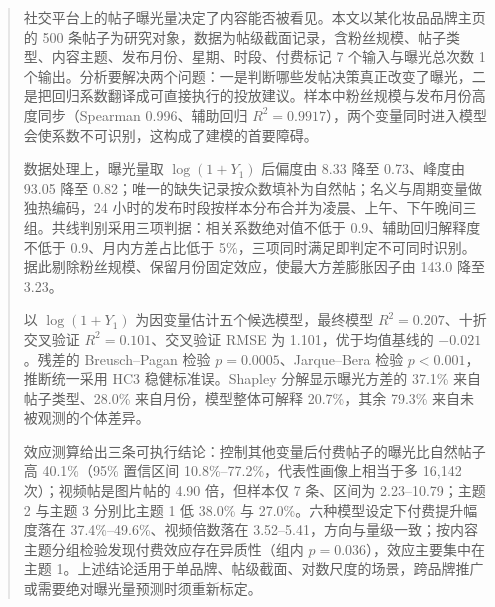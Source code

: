 \begin{abstract}

社交平台上的帖子曝光量决定了内容能否被看见。本文以某化妆品品牌主页的 500 条帖子为研究对象，数据为帖级截面记录，含粉丝规模、帖子类型、内容主题、发布月份、星期、时段、付费标记 7 个输入与曝光总次数 1 个输出。分析要解决两个问题：一是判断哪些发帖决策真正改变了曝光，二是把回归系数翻译成可直接执行的投放建议。样本中粉丝规模与发布月份高度同步（Spearman 0.996、辅助回归 $R^2=0.9917$），两个变量同时进入模型会使系数不可识别，这构成了建模的首要障碍。

数据处理上，曝光量取 $\log(1+Y_1)$ 后偏度由 8.33 降至 0.73、峰度由 93.05 降至 0.82；唯一的缺失记录按众数填补为自然帖；名义与周期变量做独热编码，24 小时的发布时段按样本分布合并为凌晨、上午、下午晚间三组。共线判别采用三项判据：相关系数绝对值不低于 0.9、辅助回归解释度不低于 0.9、月内方差占比低于 5\%，三项同时满足即判定不可同时识别。据此剔除粉丝规模、保留月份固定效应，使最大方差膨胀因子由 143.0 降至 3.23。

以 $\log(1+Y_1)$ 为因变量估计五个候选模型，最终模型 $R^2=0.207$、十折交叉验证 $R^2=0.101$、交叉验证 RMSE 为 1.101，优于均值基线的 $-0.021$。残差的 Breusch--Pagan 检验 $p=0.0005$、Jarque--Bera 检验 $p<0.001$，推断统一采用 HC3 稳健标准误。Shapley 分解显示曝光方差的 37.1\% 来自帖子类型、28.0\% 来自月份，模型整体可解释 20.7\%，其余 79.3\% 来自未被观测的个体差异。

效应测算给出三条可执行结论：控制其他变量后付费帖子的曝光比自然帖子高 40.1\%（95\% 置信区间 10.8\%--77.2\%，代表性画像上相当于多 16,142 次）；视频帖是图片帖的 4.90 倍，但样本仅 7 条、区间为 2.23--10.79；主题 2 与主题 3 分别比主题 1 低 38.0\% 与 27.0\%。六种模型设定下付费提升幅度落在 37.4\%--49.6\%、视频倍数落在 3.52--5.41，方向与量级一致；按内容主题分组检验发现付费效应存在异质性（组内 $p=0.036$），效应主要集中在主题 1。上述结论适用于单品牌、帖级截面、对数尺度的场景，跨品牌推广或需要绝对曝光量预测时须重新标定。


\end{abstract}
